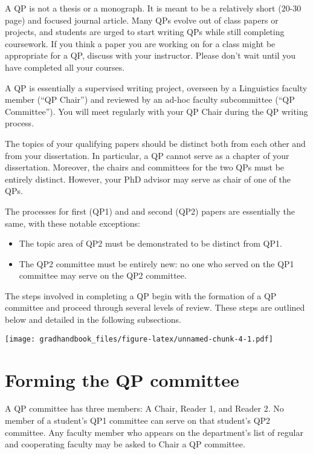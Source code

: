 \documentclass[
]{book}
\providecommand{\tightlist}{%
  \setlength{\itemsep}{0pt}\setlength{\parskip}{0pt}}
\begin{document}
A QP is not a thesis or a monograph. It is meant to be a relatively short (20-30 page) and focused journal article. Many QPs evolve out of class papers or projects, and students are urged to start writing QPs while still completing coursework. If you think a paper you are working on for a class might be appropriate for a QP, discuss with your instructor. Please don't wait until you have completed all your courses.

A QP is essentially a supervised writing project, overseen by a Linguistics faculty member (``QP Chair'') and reviewed by an ad-hoc faculty subcommittee (``QP Committee''). You will meet regularly with your QP Chair during the QP writing process.

The topics of your qualifying papers should be distinct both from each other and from your dissertation. In particular, a QP cannot serve as a chapter of your dissertation. Moreover, the chairs and committees for the two QPs must be entirely distinct. However, your PhD advisor may serve as chair of one of the QPs.

The processes for first (QP1) and and second (QP2) papers are essentially the same, with these notable exceptions:

\begin{itemize}
\tightlist
\item
  The topic area of QP2 must be demonstrated to be distinct from QP1.
\item
  The QP2 committee must be entirely new: no one who served on the QP1 committee may serve on the QP2 committee.
\end{itemize}

The steps involved in completing a QP begin with the formation of a QP committee and proceed through several levels of review. These steps are outlined below and detailed in the following subsections.

\texttt{[image: gradhandbook\_files/figure-latex/unnamed-chunk-4-1.pdf]}

\hypertarget{QP_committee}{%
\section{Forming the QP committee}\label{QP_committee}}

A QP committee has three members: A Chair, Reader 1, and Reader 2. No member of a student's QP1 committee can serve on that student's QP2 committee. Any faculty member who appears on the department's list of regular and cooperating faculty may be asked to Chair a QP committee.
\end{document}
